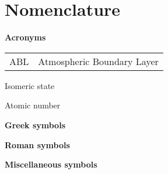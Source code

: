 \chapter*{Nomenclature}

\textbf{Acronyms}

\begin{tabular}{ p{3cm}  l }
	ABL & Atmospheric Boundary Layer
\end{tabular}

  Isomeric state\par
{}  Atomic number\par

\textbf{Greek symbols}


\textbf{Roman symbols}

\textbf{Miscellaneous symbols}